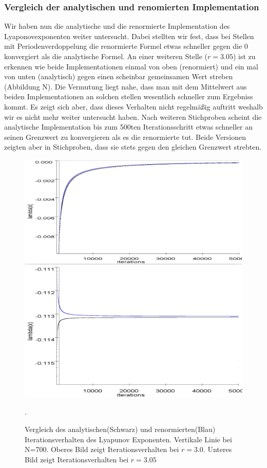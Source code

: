 \documentclass{scrartcl}
\begin{document}
\subsubsection{Vergleich der analytischen und renomierten Implementation}
Wir haben nun die analytische und die renormierte Implementation des Lyaponovexponenten weiter untersucht. Dabei stellten wir fest, dass bei Stellen mit Periodenverdoppelung die renormierte Formel etwas schneller gegen die 0 konvergiert als die analytische Formel. An einer weiteren Stelle ($r=3.05$) ist zu erkennen wie beide Implementationen einmal von oben (renormiert) und ein mal von unten (analytisch) gegen einen scheinbar gemeinsamen Wert streben (Abbildung N). Die Vermutung liegt nahe, dass man mit dem Mittelwert aus beiden Implementationen an solchen stellen wesentlich schneller zum Ergebniss kommt. Es zeigt sich aber, dass dieses Verhalten nicht regelmäßig auftritt weshalb wir es nicht mehr weiter untersucht haben. Nach weiteren Stichproben scheint die analytische Implementation bis zum 500ten Iterationsschritt etwas schneller an seinen Grenzwert zu konvergieren als es die renormierte tut. Beide Versionen zeigten aber in Stichproben, dass sie stets gegen den gleichen Grenzwert strebten.
\begin{figure}
\centering
\includegraphics[scale=0.40]{lyapunov-analysis-300}
\includegraphics[scale=0.35]{lyapunov-analysis-305}
\caption{Vergleich des analytischen(Schwarz) und renormierten(Blau) Iterationsverhalten des Lyapunov Exponenten. Vertikale Linie bei N=700. Oberes Bild zeigt Iterationsverhalten bei $r=3.0$. Unteres Bild zeigt Iterationsverhalten bei $r=3.05$ }. 
\end{figure}
\end{document}
